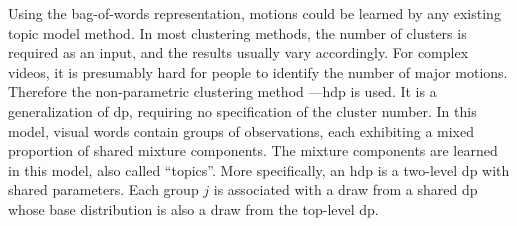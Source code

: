 Using the bag-of-words representation, motions could be learned by any existing topic model method. 
In most clustering methods, the number of clusters is required as an input, and the results usually vary accordingly. For complex videos, it is presumably hard for people to identify the number of major motions. Therefore the non-parametric clustering method ---\gls{hdp} is used. 
It is a generalization of \gls{dp}, requiring no specification of the cluster number. 
In this model, visual words contain groups of observations, each exhibiting a mixed proportion of shared mixture components. 
The mixture components are learned in this model, also called ``topics''. 
More specifically, an \gls{hdp} is a two-level \gls{dp} with shared parameters. Each group $j$ is associated with a draw from a shared \gls{dp} whose base distribution is also a draw from the top-level \gls{dp}.
